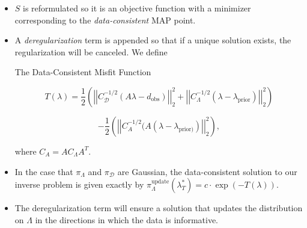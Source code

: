 \documentclass[11pt]{beamer}
\begin{document}
\begin{frame}

\begin{itemize}




	\item $S$ is reformulated so it is an objective function with a minimizer corresponding to the \textit{data-consistent} MAP point. 
	
		\item A \textit{deregularization} term is appended so that if a unique solution exists, the regularization will be canceled. We define
	
\begin{block}{The Data-Consistent Misfit Function}


$$T(\lambda)=\frac{1}{2}\left(\left|\left|C_\mathcal{D}^{-1/2}(A\lambda-d_{\text{obs}})\right|\right|_2^2+\left|\left|C_\Lambda^{-1/2}(\lambda-\lambda_{\text{prior}})\right|\right|_2^2\right)$$
	

\begin{equation} \label{eq:3}
-\frac{1}{2}\left(\left|\left|C_A^{-1/2}(A(\lambda-\lambda_{\text{prior})})\right|\right|_2^2\right),
\end{equation} 

\noindent where $C_A=AC_\Lambda A^T$. 
	
\end{block}


\end{itemize}

\end{frame}


\begin{frame}



\begin{itemize}


	\item In the case that $\pi_\Lambda$ and $\pi_\mathcal{D}$ are Gaussian, the data-consistent solution to our inverse problem is given exactly by $\pi_\Lambda^\text{update}(\lambda_T^*)= c\cdot \exp(-T(\lambda))$. 

	\item The deregularization term will ensure a solution that updates the distribution on $\Lambda$ in the directions in which the data is informative. 



\end{itemize}



\end{frame}
\end{document}
